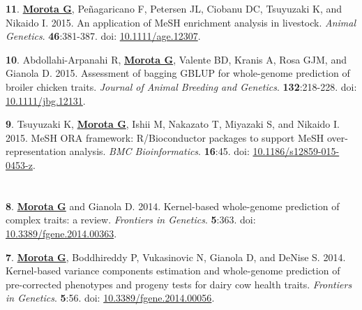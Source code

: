 \documentclass[margin,line,10pt]{res}
\newenvironment{list1}{
  \begin{list}{\ding{113}}{%
      \setlength{\itemsep}{0in}
      \setlength{\parsep}{0in} \setlength{\parskip}{0in}
      \setlength{\topsep}{0in} \setlength{\partopsep}{0in} 
      \setlength{\leftmargin}{0.17in}}}{\end{list}}
\begin{document}
\begin{resume}
\begin{list1}
\item [{\bf 11}.] {\bf \underline{Morota G}}, Pe\~{n}agaricano F, Petersen JL, Ciobanu DC, Tsuyuzaki K, and Nikaido I. 2015. An application of MeSH enrichment analysis in livestock. \emph{Animal Genetics}. \textbf{46}:381-387. doi: \textcolor{blue}{\href{http://dx.doi.org/10.1111/age.12307}{10.1111/age.12307}}.  

\vspace{0.5cm}

\item [{\bf 10}.] Abdollahi-Arpanahi R, {\bf \underline{Morota G}}, Valente BD, Kranis A, Rosa GJM, and Gianola D. 2015. Assessment of bagging GBLUP for whole-genome prediction of broiler chicken traits. \emph{Journal of Animal Breeding and Genetics}. \textbf{132}:218-228. doi: \textcolor{blue}{\href{http://dx.doi.org/10.1111/jbg.12131}{10.1111/jbg.12131}}.  

\vspace{0.5cm}

\item [{\bf 9}.]  Tsuyuzaki K, {\bf \underline{Morota G}}, Ishii M, Nakazato T, Miyazaki S, and Nikaido I. 2015. 
  MeSH ORA framework: R/Bioconductor packages to support MeSH over-representation analysis. \emph{BMC Bioinformatics}. {\bf 16}:45. doi: \textcolor{blue}{\href{http://dx.doi.org/10.1186/s12859-015-0453-z}{10.1186/s12859-015-0453-z}}. 

\end{list1}


\section{}

\begin{list1}


\item [{\bf 8}.]  {\bf \underline{Morota G}} and Gianola D. 2014. 
  Kernel-based whole-genome prediction of complex traits: a review. \emph{Frontiers in Genetics}. {\bf 5}:363. doi: \textcolor{blue}{\href{http://dx.doi.org/10.3389/fgene.2014.00363}{10.3389/fgene.2014.00363}}. 

\vspace{0.5cm}

\item [{\bf 7}.]  {\bf \underline{Morota G}}, Boddhireddy P, Vukasinovic N, Gianola D, and DeNise S.  2014. Kernel-based variance components estimation and  whole-genome prediction of pre-corrected phenotypes and progeny tests for dairy cow health traits. \emph{Frontiers in Genetics}. {\bf 5}:56. doi: \textcolor{blue}{\href{http://dx.doi.org/10.3389/fgene.2014.00056}{10.3389/fgene.2014.00056}}. 


\end{list1}
\end{resume}
\end{document}
